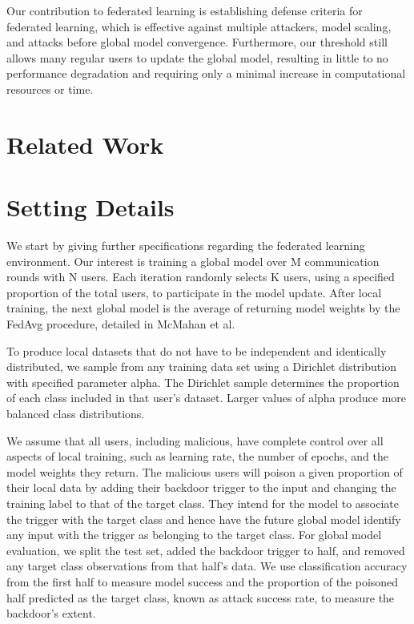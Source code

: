 \documentclass{article} %
\begin{document}
Our contribution to federated learning is establishing defense criteria for federated learning, which is effective against multiple attackers, model scaling, and attacks before global model convergence. Furthermore, our threshold still allows many regular users to update the global model, resulting in little to no performance degradation and requiring only a minimal increase in computational resources or time.

%
\section{Related Work}

%
\section{Setting Details}

We start by giving further specifications regarding the federated learning environment. Our interest is training a global model over M communication rounds with N users. Each iteration randomly selects K users, using a specified proportion of the total users, to participate in the model update. After local training, the next global model is the average of returning model weights by the FedAvg procedure, detailed in McMahan et al. 

To produce local datasets that do not have to be independent and identically distributed, we sample from any training data set using a Dirichlet distribution with specified parameter alpha. The Dirichlet sample determines the proportion of each class included in that user's dataset. Larger values of alpha produce more balanced class distributions.

We assume that all users, including malicious, have complete control over all aspects of local training, such as learning rate, the number of epochs, and the model weights they return. The malicious users will poison a given proportion of their local data by adding their backdoor trigger to the input and changing the training label to that of the target class. They intend for the model to associate the trigger with the target class and hence have the future global model identify any input with the trigger as belonging to the target class. For global model evaluation, we split the test set, added the backdoor trigger to half, and removed any target class observations from that half's data. We use classification accuracy from the first half to measure model success and the proportion of the poisoned half predicted as the target class, known as attack success rate, to measure the backdoor's extent.
\end{document}

